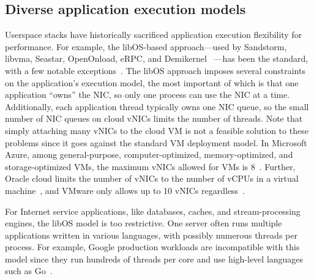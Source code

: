 \subsection{Diverse application execution models}
\label{subsec:sidecar}
Userspace stacks have historically sacrificed application execution flexibility for performance.
For example, the libOS-based approach---used by Sandstorm, libvma, Seastar, OpenOnload, eRPC, and Demikernel~\cite{Marinos:sigcomm14, libvma, seastar, openonload, erpc, demi-kernel} ---has been the standard, with a few notable exceptions~\cite{tas, snap}.
The libOS approach imposes several constraints on the application's execution model, the most important of which is that one application ``owns'' the NIC, so only one process can use the NIC at a time.
Additionally, each application thread typically owns one NIC queue, so the small number of NIC queues on cloud vNICs limits the number of threads.
Note that simply attaching many vNICs to the cloud VM is not a feasible solution to these problems since it goes against the standard VM deployment model.
In Microsoft Azure, among general-purpose, computer-optimized, memory-optimized, and storage-optimized VMs, the maximum vNICs allowed for VMs is 8~\cite{azure-vnic}.
Further, Oracle cloud limits the number of vNICs to the number of vCPUs in a virtual machine~\cite{oracle-vnic}, and VMware only allows up to 10 vNICs regardless~\cite{vmware-vnic}.


For Internet service applications, like databases, caches, and stream-processing engines, the libOS model is too restrictive.
One server often runs multiple applications written in various languages, with possibly numerous threads per process.
For example, Google production workloads are incompatible with this model since they run hundreds of threads per core and use high-level languages such as Go~\cite{google-workload}.


